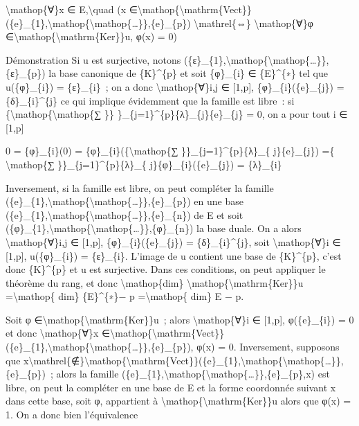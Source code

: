 \documentclass[]{article}
\begin{document}
\textbackslash{}mathop\{∀\}x ∈ E,\textbackslash{}quad (x
∈\textbackslash{}mathop\{\textbackslash{}mathrm\{Vect\}\}(\{e\}\_\{1\},\textbackslash{}mathop\{\textbackslash{}mathop\{\ldots{}\}\},\{e\}\_\{p\})
\textbackslash{}mathrel\{⇔\} \textbackslash{}mathop\{∀\}φ
∈\textbackslash{}mathop\{\textbackslash{}mathrm\{Ker\}\}u, φ(x) = 0)

Démonstration Si u est surjective, notons
(\{ε\}\_\{1\},\textbackslash{}mathop\{\textbackslash{}mathop\{\ldots{}\}\},\{ε\}\_\{p\})
la base canonique de \{K\}\^{}\{p\} et soit \{φ\}\_\{i\} ∈
\{E\}\^{}\{∗\} tel que u(\{φ\}\_\{i\}) = \{ε\}\_\{i\}~; on a donc
\textbackslash{}mathop\{∀\}i,j ∈ {[}1,p{]}, \{φ\}\_\{i\}(\{e\}\_\{j\}) =
\{δ\}\_\{i\}\^{}\{j\} ce qui implique évidemment que la famille est
libre~: si \{\textbackslash{}mathop\{\textbackslash{}mathop\{∑ \}\}
\}\_\{j=1\}\^{}\{p\}\{λ\}\_\{j\}\{e\}\_\{j\} = 0, on a pour tout i ∈
{[}1,p{]}

0 = \{φ\}\_\{i\}(0) = \{φ\}\_\{i\}(\{\textbackslash{}mathop\{∑
\}\}\_\{j=1\}\^{}\{p\}\{λ\}\_\{ j\}\{e\}\_\{j\}) =\{
\textbackslash{}mathop\{∑ \}\}\_\{j=1\}\^{}\{p\}\{λ\}\_\{
j\}\{φ\}\_\{i\}(\{e\}\_\{j\}) = \{λ\}\_\{i\}

Inversement, si la famille est libre, on peut compléter la famille
(\{e\}\_\{1\},\textbackslash{}mathop\{\textbackslash{}mathop\{\ldots{}\}\},\{e\}\_\{p\})
en une base
(\{e\}\_\{1\},\textbackslash{}mathop\{\textbackslash{}mathop\{\ldots{}\}\},\{e\}\_\{n\})
de E et soit
(\{φ\}\_\{1\},\textbackslash{}mathop\{\textbackslash{}mathop\{\ldots{}\}\},\{φ\}\_\{n\})
la base duale. On a alors \textbackslash{}mathop\{∀\}i,j ∈ {[}1,p{]},
\{φ\}\_\{i\}(\{e\}\_\{j\}) = \{δ\}\_\{i\}\^{}\{j\}, soit
\textbackslash{}mathop\{∀\}i ∈ {[}1,p{]}, u(\{φ\}\_\{i\}) =
\{ε\}\_\{i\}. L'image de u contient une base de \{K\}\^{}\{p\}, c'est
donc \{K\}\^{}\{p\} et u est surjective. Dans ces conditions, on peut
appliquer le théorème du rang, et donc \textbackslash{}mathop\{dim\}
\textbackslash{}mathop\{\textbackslash{}mathrm\{Ker\}\}u
=\textbackslash{}mathop\{ dim\} \{E\}\^{}\{∗\}− p
=\textbackslash{}mathop\{ dim\} E − p.

Soit φ ∈\textbackslash{}mathop\{\textbackslash{}mathrm\{Ker\}\}u~; alors
\textbackslash{}mathop\{∀\}i ∈ {[}1,p{]}, φ(\{e\}\_\{i\}) = 0 et donc
\textbackslash{}mathop\{∀\}x
∈\textbackslash{}mathop\{\textbackslash{}mathrm\{Vect\}\}(\{e\}\_\{1\},\textbackslash{}mathop\{\textbackslash{}mathop\{\ldots{}\}\},\{e\}\_\{p\}),
φ(x) = 0. Inversement, supposons que
x\textbackslash{}mathrel\{∉\}\textbackslash{}mathop\{\textbackslash{}mathrm\{Vect\}\}(\{e\}\_\{1\},\textbackslash{}mathop\{\textbackslash{}mathop\{\ldots{}\}\},\{e\}\_\{p\})~;
alors la famille
(\{e\}\_\{1\},\textbackslash{}mathop\{\textbackslash{}mathop\{\ldots{}\}\},\{e\}\_\{p\},x)
est libre, on peut la compléter en une base de E et la forme coordonnée
suivant x dans cette base, soit φ, appartient à
\textbackslash{}mathop\{\textbackslash{}mathrm\{Ker\}\}u alors que φ(x)
= 1. On a donc bien l'équivalence
\end{document}
